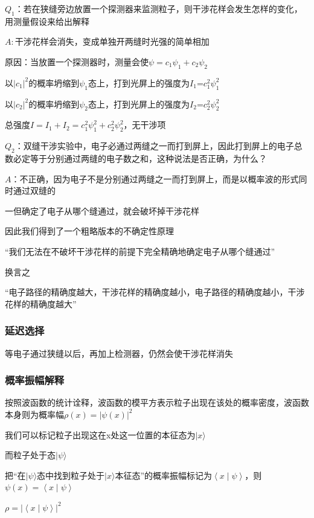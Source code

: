 \documentclass[lang=cn,15pt]{elegantbook}
\begin{document}
$Q_1$：若在狭缝旁边放置一个探测器来监测粒子，则干涉花样会发生怎样的变化，用测量假设来给出解释

$A:$干涉花样会消失，变成单独开两缝时光强的简单相加

原因：当放置一个探测器时，测量会使$\psi=c_1\psi_1+c_2\psi_2$

以$|c_1|^2$的概率坍缩到$\psi_1$态上，打到光屏上的强度为$I_1$=$c_1^{2}\psi_1^{2}$

以$|c_2|^2$的概率坍缩到$\psi_2$态上，打到光屏上的强度为$I_2$=$c_2^{2}\psi_2^{2}$

总强度$I=I_1+I_2=c_1^{2}\psi_1^{2}+c_2^{2}\psi_2^{2}$，无干涉项


$Q_2$：双缝干涉实验中，电子必通过两缝之一而打到屏上，因此打到屏上的电子总数必定等于分别通过两缝的电子数之和，这种说法是否正确，为什么？

$A$：不正确，因为电子不是分别通过两缝之一而打到屏上，而是以概率波的形式同时通过双缝的

一但确定了电子从哪个缝通过，就会破坏掉干涉花样

因此我们得到了一个粗略版本的不确定性原理

“我们无法在不破坏干涉花样的前提下完全精确地确定电子从哪个缝通过”

换言之

“电子路径的精确度越大，干涉花样的精确度越小，电子路径的精确度越小，干涉花样的精确度越大”

\subsubsection{延迟选择}

等电子通过狭缝以后，再加上检测器，仍然会使干涉花样消失

\subsubsection{概率振幅解释}
按照波函数的统计诠释，波函数的模平方表示粒子出现在该处的概率密度，波函数本身则为概率幅$\rho(x)=|\psi(x)|^2$

我们可以标记粒子出现这在x处这一位置的本征态为$|x\rangle $

而粒子处于态$|\psi\rangle $

把“在$|\psi\rangle $态中找到粒子处于$|x\rangle $本征态”的概率振幅标记为$\left< x \middle| \psi \right> $，则$\psi(x)=\left< x \middle| \psi \right>$

$\rho=|\left< x \middle| \psi \right> |^2$
\end{document}
